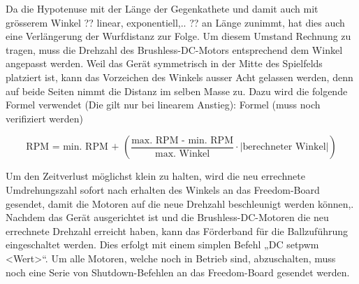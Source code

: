 \newline
Da die Hypotenuse mit der Länge der Gegenkathete und damit auch mit grösserem Winkel ?? linear, exponentiell,.. ?? an Länge zunimmt, 
hat dies auch eine Verlängerung der Wurfdistanz zur Folge. Um diesem Umstand Rechnung zu tragen, muss die Drehzahl des 
Brushless-DC-Motors entsprechend dem Winkel angepasst werden. Weil das Gerät symmetrisch in der Mitte des Spielfelds platziert ist, 
kann das Vorzeichen des Winkels ausser Acht gelassen werden, denn auf beide Seiten nimmt die Distanz im selben Masse zu.
Dazu wird die folgende Formel verwendet (Die gilt nur bei linearem Anstieg):
\newline
\newline
Formel (muss noch verifiziert werden)
 
 \begin{equation}
 \text{RPM = min. RPM + } \left( \frac{\text{max. RPM - min. RPM}}{\text{max. Winkel}} \cdot \text{|berechneter Winkel|} \right)
 \end{equation}
 
Um den Zeitverlust möglichst klein zu halten, wird die neu errechnete Umdrehungszahl sofort nach erhalten des Winkels an das 
Freedom-Board gesendet, damit die Motoren auf die neue Drehzahl beschleunigt werden können,.
Nachdem das Gerät ausgerichtet ist und die Brushless-DC-Motoren die neu errechnete Drehzahl erreicht haben, kann das Förderband 
für die Ballzuführung eingeschaltet werden. Dies erfolgt mit einem simplen Befehl „DC setpwm <Wert>“. 
Um alle Motoren, welche noch in Betrieb sind, abzuschalten, muss noch eine Serie von Shutdown-Befehlen an das 
Freedom-Board gesendet werden. 


            
            
